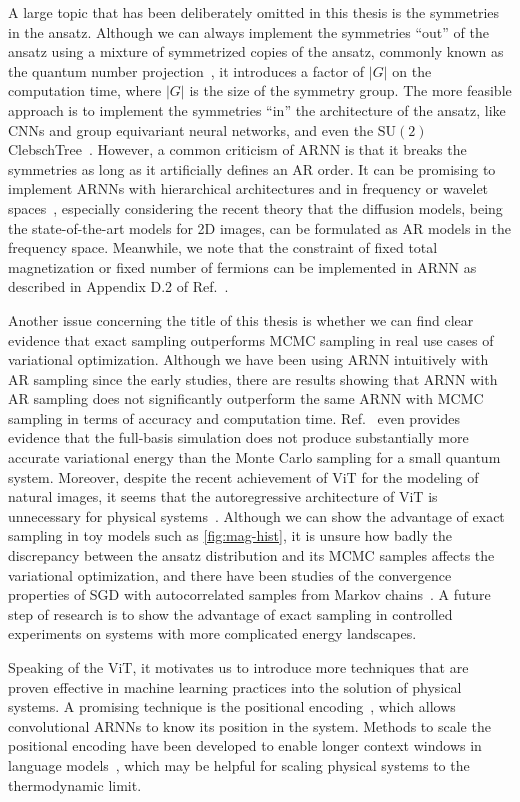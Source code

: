 A large topic that has been deliberately omitted in this thesis is the symmetries in the ansatz. Although we can always implement the symmetries ``out'' of the ansatz using a mixture of symmetrized copies of the ansatz, commonly known as the quantum number projection~\cite{tahara2008variational}, it introduces a factor of $|G|$ on the computation time, where $|G|$ is the size of the symmetry group. The more feasible approach is to implement the symmetries ``in'' the architecture of the ansatz, like CNNs and group equivariant neural networks, and even the $\mathrm{SU}(2)$ ClebschTree~\cite{vieijra2021many}. However, a common criticism of ARNN is that it breaks the symmetries as long as it artificially defines an AR order. It can be promising to implement ARNNs with hierarchical architectures and in frequency or wavelet spaces~\cite{nash2021generating, bialas2022hierarchical, hoogeboom2022autoregressive, mattar2024wavelets}, especially considering the recent theory that the diffusion models, being the state-of-the-art models for 2D images, can be formulated as AR models in the frequency space. Meanwhile, we note that the constraint of fixed total magnetization or fixed number of fermions can be implemented in ARNN as described in Appendix D.2 of Ref.~\cite{hibat2020recurrent}.

Another issue concerning the title of this thesis is whether we can find clear evidence that exact sampling outperforms MCMC sampling in real use cases of variational optimization. Although we have been using ARNN intuitively with AR sampling since the early studies, there are results showing that ARNN with AR sampling does not significantly outperform the same ARNN with MCMC sampling in terms of accuracy and computation time. Ref.~\cite{bukov2021learning} even provides evidence that the full-basis simulation does not produce substantially more accurate variational energy than the Monte Carlo sampling for a small quantum system. Moreover, despite the recent achievement of ViT for the modeling of natural images, it seems that the autoregressive architecture of ViT is unnecessary for physical systems~\cite{viteritti2023transformer, rende2024queries}. Although we can show the advantage of exact sampling in toy models such as \cref{fig:mag-hist}, it is unsure how badly the discrepancy between the ansatz distribution and its MCMC samples affects the variational optimization, and there have been studies of the convergence properties of SGD with autocorrelated samples from Markov chains~\cite{sun2018markov}. A future step of research is to show the advantage of exact sampling in controlled experiments on systems with more complicated energy landscapes.


Speaking of the ViT, it motivates us to introduce more techniques that are proven effective in machine learning practices into the solution of physical systems. A promising technique is the positional encoding~\cite{ke2021rethinking}, which allows convolutional ARNNs to know its position in the system. Methods to scale the positional encoding have been developed to enable longer context windows in language models~\cite{liu2024scaling, peng2024yarn}, which may be helpful for scaling physical systems to the thermodynamic limit.
